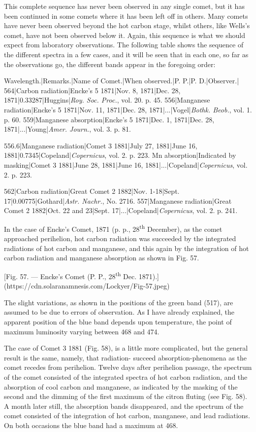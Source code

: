 \documentclass[a4paper, 12pt, oneside, polutonikogreek, english]{article}
\begin{document}
This complete sequence has never been observed in any single comet, but it has been continued in some comets where it has been left off in others. Many comets have never been observed beyond the hot carbon stage, whilst others, like Wells's comet, have not been observed below it. Again, this sequence is what we should expect from laboratory observations. The following table shows the sequence of the different spectra in a few cases, and it will be seen that in each one, so far as the observations go, the different bands appear in the foregoing order:

Wavelength.|Remarks.|Name of Comet.|When observed.|P. P.|P. D.|Observer.| 
564|Carbon radiation|Encke's 5 1871|Nov. 8, 1871|Dec. 28, 1871|0.33287|Huggins|\emph{Roy. Soc. Proc.}, vol. 20. p. 45. 
556|Manganese radiation|Encke's 5 1871|Nov. 11, 1871|Dec. 28, 1871|...|Vogel|\emph{Bothk. Beob.}, vol. 1. p. 60. 
559|Manganese absorption|Encke's 5 1871|Dec. 1, 1871|Dec. 28, 1871|...|Young|\emph{Amer. Journ.}, vol. 3. p. 81. 

556.6|Manganese radiation|Comet 3 1881|July 27, 1881|June 16, 1881|0.7345|Copeland|\emph{Copernicus}, vol. 2. p. 223. 
Mn absorption|Indicated by masking|Comet 3 1881|June 28, 1881|June 16, 1881|...|Copeland|\emph{Copernicus}, vol. 2. p. 223. 

562|Carbon radiation|Great Comet 2 1882|Nov. 1-18|Sept. 17|0.00775|Gothard|\emph{Astr. Nachr.}, No. 2716. 
557|Manganese radiation|Great Comet 2 1882|Oct. 22 and 23|Sept. 17|...|Copeland|\emph{Copernicus}, vol. 2. p. 241.

In the case of Encke's Comet, 1871 (p. p., 28\textsuperscript{th} December), as the comet approached perihelion, hot carbon radiation was succeeded by the integrated radiations of hot carbon and manganese, and this again by the integration of hot carbon radiation and manganese absorption as shown in Fig. 57.

[Fig. 57. --- Encke's Comet (P. P., 28\textsuperscript{th} Dec. 1871).](https://cdn.solaranamnesis.com/Lockyer/Fig-57.jpeg)

The slight variations, as shown in the positions of the green band (517), are assumed to be due to errors of observation. As I have already explained, the apparent position of the blue band depends upon temperature, the point of maximum luminosity varying between 468 and 474.

The case of Comet 3 1881 (Fig. 58), is a little more complicated, but the general result is the same, namely, that radiation- succeed absorption-phenomena as the comet recedes from perihelion. Twelve days after perihelion passage, the spectrum of the comet consisted of the integrated spectra of hot carbon radiation, and the absorption of cool carbon and manganese, as indicated by the masking of the second and the dimming of the first maximum of the citron fluting (see Fig. 58). A month later still, the absorption bands disappeared, and the spectrum of the comet consisted of the integration of hot carbon, manganese, and lead radiations. On both occasions the blue band had a maximum at 468.
\end{document}
